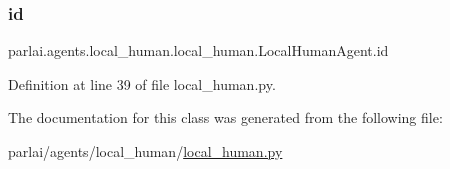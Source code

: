 \subsubsection{\texorpdfstring{id}{id}}
{\footnotesize\ttfamily parlai.\+agents.\+local\+\_\+human.\+local\+\_\+human.\+Local\+Human\+Agent.\+id}



Definition at line 39 of file local\+\_\+human.\+py.



The documentation for this class was generated from the following file\+:\begin{DoxyCompactItemize}
\item 
parlai/agents/local\+\_\+human/\hyperlink{local__human_8py}{local\+\_\+human.\+py}\end{DoxyCompactItemize}
